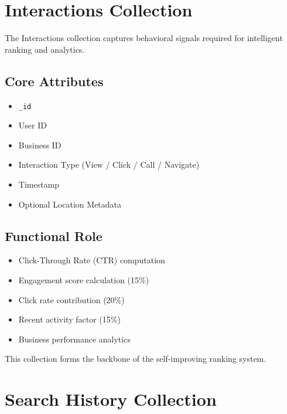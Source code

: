 \documentclass[12pt,a4paper]{report}
\begin{document}
\section{Interactions Collection}

The Interactions collection captures behavioral signals required for intelligent ranking and analytics.

\subsection*{Core Attributes}

\begin{itemize}

\item \texttt{\_id}

\item User ID

\item Business ID

\item Interaction Type (View / Click / Call / Navigate)

\item Timestamp

\item Optional Location Metadata

\end{itemize}

\subsection*{Functional Role}

\begin{itemize}

\item Click-Through Rate (CTR) computation

\item Engagement score calculation (15\%)

\item Click rate contribution (20\%)

\item Recent activity factor (15\%)

\item Business performance analytics

\end{itemize}

This collection forms the backbone of the self-improving ranking system.

\section{Search History Collection}
\end{document}
